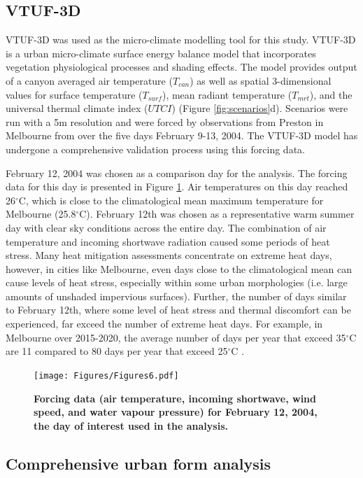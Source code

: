 \documentclass[final,3p,times,authoryear]{elsarticle}
\begin{document}
\subsection{VTUF-3D}\label{sec:methodsvtuf}
VTUF-3D \citep{Nice2018a} was used as the micro-climate modelling tool for this study. VTUF-3D is a urban micro-climate surface energy balance model that incorporates vegetation physiological processes and shading effects. The model provides output of a canyon averaged air temperature ($T_{can}$) as well as spatial 3-dimensional values for surface temperature ($T_{surf}$), mean radiant temperature ($T_{mrt}$), and the universal thermal climate index ($UTCI$) (Figure \ref{fig:scenarios}d). Scenarios were run with a 5m resolution and were forced by observations from Preston in Melbourne from \cite{Coutts2007} over the five days February 9-13, 2004. The VTUF-3D model has undergone a comprehensive validation process \citep{Nice2016,Nice2018a} using this forcing data.

February 12, 2004 was chosen as a comparison day for the analysis. The forcing data for this day is presented in Figure \ref{fig:forcing}. Air temperatures on this day reached 26$^{\circ}$C, which is close to the climatological mean maximum temperature for Melbourne (25.8$^{\circ}$C). February 12th was chosen as a representative warm summer day with clear sky conditions across the entire day. The combination of air temperature and incoming shortwave radiation caused some periods of heat stress. Many heat mitigation assessments concentrate on extreme heat days, however, in cities like Melbourne, even days close to the climatological mean can cause levels of heat stress, especially within some urban morphologies (i.e. large amounts of unshaded impervious surfaces). Further, the number of days similar to February 12th, where some level of heat stress and thermal discomfort can be experienced, far exceed the number of extreme heat days. For example, in Melbourne over 2015-2020, the average number of days per year that exceed 35$^{\circ}$C are 11 compared to 80 days per year that exceed 25$^{\circ}$C \citep{BureauofMeteorology2021}.

\begin{figure}
\centering
\texttt{[image: Figures/Figures6.pdf]}
\caption{\bf Forcing data (air temperature, incoming shortwave, wind speed, and water vapour pressure) for February 12, 2004, the day of interest used in the analysis.}
 \label{fig:forcing}
\end{figure} 

\subsection{Comprehensive urban form analysis}\label{sec:methodsparam}
\end{document}
